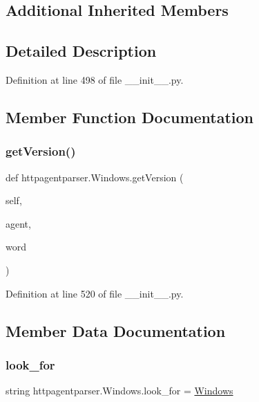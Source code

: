 \subsection*{Additional Inherited Members}


\subsection{Detailed Description}


Definition at line 498 of file \+\_\+\+\_\+init\+\_\+\+\_\+.\+py.



\subsection{Member Function Documentation}
\hypertarget{classhttpagentparser_1_1_windows_a49b32a00eec20a975680d1fba0def559}{}\label{classhttpagentparser_1_1_windows_a49b32a00eec20a975680d1fba0def559} 
\subsubsection{\texorpdfstring{get\+Version()}{getVersion()}}
{\footnotesize\ttfamily def httpagentparser.\+Windows.\+get\+Version (\begin{DoxyParamCaption}\item[{}]{self,  }\item[{}]{agent,  }\item[{}]{word }\end{DoxyParamCaption})}



Definition at line 520 of file \+\_\+\+\_\+init\+\_\+\+\_\+.\+py.



\subsection{Member Data Documentation}
\hypertarget{classhttpagentparser_1_1_windows_a81b00b5dfc77386615d0ebbd4754991f}{}\label{classhttpagentparser_1_1_windows_a81b00b5dfc77386615d0ebbd4754991f} 
\subsubsection{\texorpdfstring{look\+\_\+for}{look\_for}}
{\footnotesize\ttfamily string httpagentparser.\+Windows.\+look\+\_\+for = \textquotesingle{}\hyperlink{classhttpagentparser_1_1_windows}{Windows}\textquotesingle{}\hspace{0.3cm}{\ttfamily [static]}}



